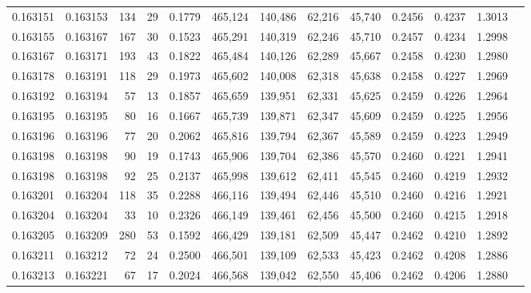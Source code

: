 \begin{tabular}{rrrrrrrrrrrrr}
0.163151 & 0.163153 &   134 &  29 &                                     0.1779 & 465,124 & 140,486 &  62,216 &  45,740 & 0.2456 & 0.4237 & 1.3013 \\
0.163155 & 0.163167 &   167 &  30 &                                     0.1523 & 465,291 & 140,319 &  62,246 &  45,710 & 0.2457 & 0.4234 & 1.2998 \\
0.163167 & 0.163171 &   193 &  43 &                                     0.1822 & 465,484 & 140,126 &  62,289 &  45,667 & 0.2458 & 0.4230 & 1.2980 \\
0.163178 & 0.163191 &   118 &  29 &                                     0.1973 & 465,602 & 140,008 &  62,318 &  45,638 & 0.2458 & 0.4227 & 1.2969 \\
0.163192 & 0.163194 &    57 &  13 &                                     0.1857 & 465,659 & 139,951 &  62,331 &  45,625 & 0.2459 & 0.4226 & 1.2964 \\
0.163195 & 0.163195 &    80 &  16 &                                     0.1667 & 465,739 & 139,871 &  62,347 &  45,609 & 0.2459 & 0.4225 & 1.2956 \\
0.163196 & 0.163196 &    77 &  20 &                                     0.2062 & 465,816 & 139,794 &  62,367 &  45,589 & 0.2459 & 0.4223 & 1.2949 \\
0.163198 & 0.163198 &    90 &  19 &                                     0.1743 & 465,906 & 139,704 &  62,386 &  45,570 & 0.2460 & 0.4221 & 1.2941 \\
0.163198 & 0.163198 &    92 &  25 &                                     0.2137 & 465,998 & 139,612 &  62,411 &  45,545 & 0.2460 & 0.4219 & 1.2932 \\
0.163201 & 0.163204 &   118 &  35 &                                     0.2288 & 466,116 & 139,494 &  62,446 &  45,510 & 0.2460 & 0.4216 & 1.2921 \\
0.163204 & 0.163204 &    33 &  10 &                                     0.2326 & 466,149 & 139,461 &  62,456 &  45,500 & 0.2460 & 0.4215 & 1.2918 \\
0.163205 & 0.163209 &   280 &  53 &                                     0.1592 & 466,429 & 139,181 &  62,509 &  45,447 & 0.2462 & 0.4210 & 1.2892 \\
0.163211 & 0.163212 &    72 &  24 &                                     0.2500 & 466,501 & 139,109 &  62,533 &  45,423 & 0.2462 & 0.4208 & 1.2886 \\
0.163213 & 0.163221 &    67 &  17 &                                     0.2024 & 466,568 & 139,042 &  62,550 &  45,406 & 0.2462 & 0.4206 & 1.2880 \\

\end{tabular}
